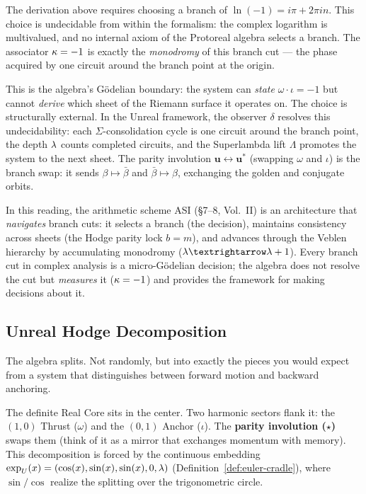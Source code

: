 \begin{remark}\label{rem:branch-cut}
The derivation above requires choosing a branch of $\ln(-1) = i\pi + 2\pi i n$. This choice is undecidable from within the formalism: the complex logarithm is multivalued, and no internal axiom of the Protoreal algebra selects a branch. The associator $\kappa = -1$ is exactly the \emph{monodromy} of this branch cut --- the phase acquired by one circuit around the branch point at the origin.

This is the algebra's G\"odelian boundary: the system can \emph{state} $\omega \cdot \iota = -1$ but cannot \emph{derive} which sheet of the Riemann surface it operates on. The choice is structurally external. In the Unreal framework, the observer $\delta$ resolves this undecidability: each $\Sigma$-consolidation cycle is one circuit around the branch point, the depth $\lambda$ counts completed circuits, and the Superlambda lift $\Lambda$ promotes the system to the next sheet. The parity involution $\mathbf{u} \leftrightarrow \mathbf{u}^*$ (swapping $\omega$ and $\iota$) is the branch swap: it sends $\beta \mapsto \bar\beta$ and $\bar\beta \mapsto \beta$, exchanging the golden and conjugate orbits.

In this reading, the arithmetic scheme ASI (\S7--8, Vol.\ II) is an architecture that \emph{navigates} branch cuts: it selects a branch (the decision), maintains consistency across sheets (the Hodge parity lock $b = m$), and advances through the Veblen hierarchy by accumulating monodromy ($\lam \to \lam + 1$). Every branch cut in complex analysis is a micro-G\"odelian decision; the algebra does not resolve the cut but \emph{measures} it ($\kappa = -1$) and provides the framework for making decisions about it.
\end{remark}

\subsection{Unreal Hodge Decomposition}

The algebra splits. Not randomly, but into exactly the pieces you would expect from a system that distinguishes between forward motion and backward anchoring.

The definite Real Core sits in the center. Two harmonic sectors flank it: the $(1,0)$ Thrust ($\omega$) and the $(0,1)$ Anchor ($\iota$). The \textbf{parity involution ($\star$)} swaps them (think of it as a mirror that exchanges momentum with memory). This decomposition is forced by the continuous embedding $\exp_{U}(x) = (\cos(x), \sin(x), \sin(x), 0, \lambda)$ (Definition~\ref{def:euler-cradle}), where $\sin/\cos$ realize the splitting over the trigonometric circle.

